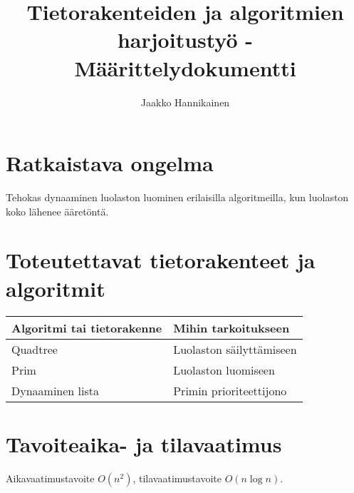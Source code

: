 \documentclass{article}
\author{Jaakko Hannikainen}
\title{Tietorakenteiden ja algoritmien harjoitustyö - Määrittelydokumentti}
\begin{document}
\maketitle

\section{Ratkaistava ongelma}
Tehokas dynaaminen luolaston luominen erilaisilla algoritmeilla, kun luolaston
koko lähenee ääretöntä.

\section{Toteutettavat tietorakenteet ja algoritmit}
\begin{table}[h]
\begin{tabular}{| l | l |}
\hline
\rowcolor{Gray}
Algoritmi tai tietorakenne & Mihin tarkoitukseen      \\ \hline
Quadtree                   & Luolaston säilyttämiseen \\ \hline
Prim                       & Luolaston luomiseen      \\ \hline
Dynaaminen lista           & Primin prioriteettijono  \\ \hline
\end{tabular}
\end{table}

\section{Tavoiteaika- ja tilavaatimus}
Aikavaatimustavoite $O(n^2)$, tilavaatimustavoite $O(n \log n)$.
\end{document}
